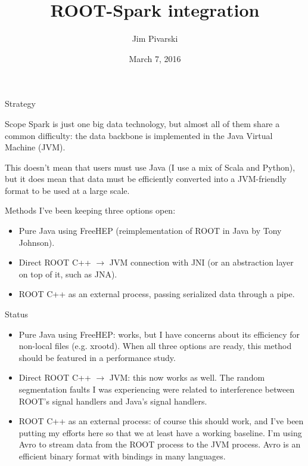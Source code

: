 \documentclass{beamer}
\title[2016-03-07-spark]{ROOT-Spark integration}
\author{Jim Pivarski}
\institute{Princeton Univeristy --- DIANA}
\date{March 7, 2016}
\begin{document}
\begin{frame}
  \titlepage
\end{frame}


\begin{frame}{Strategy}
\begin{block}{Scope}
Spark is just one big data technology, but almost all of them share a common difficulty: the data backbone is implemented in the Java Virtual Machine (JVM).

\vspace{0.2 cm}
This doesn't mean that users must use Java (I use a mix of Scala and Python), but it does mean that data must be efficiently converted into a JVM-friendly format to be used at a large scale.
\end{block}

\begin{block}{Methods}
I've been keeping three options open:
\begin{itemize}
\item Pure Java using FreeHEP (reimplementation of ROOT in Java by Tony Johnson).
\item Direct ROOT C++ $\to$ JVM connection with JNI (or an abstraction layer on top of it, such as JNA).
\item ROOT C++ as an external process, passing serialized data through a pipe.
\end{itemize}
\end{block}
\end{frame}

\begin{frame}{Status}
\begin{itemize}
\item Pure Java using FreeHEP: works, but I have concerns about its efficiency for non-local files (e.g. xrootd). When all three options are ready, this method should be featured in a performance study.

\item Direct ROOT C++ $\to$ JVM: this now works as well. The random segmentation faults I was experiencing were related to interference between ROOT's signal handlers and Java's signal handlers.

\item ROOT C++ as an external process: of course this should work, and I've been putting my efforts here so that we at least have a working baseline. I'm using Avro to stream data from the ROOT process to the JVM process. Avro is an efficient binary format with bindings in many languages.
\end{itemize}




\end{frame}
\end{document}
